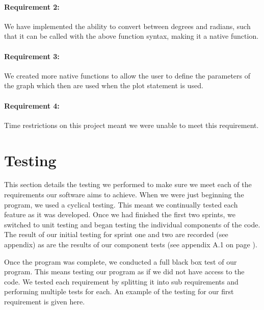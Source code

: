 \documentclass[a4paper, oneside, 11pt]{report}
\begin{document}
\subsubsection{Requirement 2:}
We have implemented the ability to convert between degrees and radians, such that it can be called with the above function syntax, making it a native function.

\subsubsection{Requirement 3:}
We created more native functions to allow the user to define the parameters of the graph which then are used when the plot statement is used.

\subsubsection{Requirement 4:}
Time restrictions on this project meant we were unable to meet this requirement.

\chapter{Testing}

This section details the testing we performed to make sure we meet each of the requirements our software aims to achieve. When we were just beginning the program, we used a cyclical testing. This meant we continually tested each feature as it was developed. Once we had finished the first two sprints, we switched to unit testing and began testing the individual components of the code. The result of our initial testing for sprint one and two are recorded (see appendix) as are the results of our component tests (see appendix A.1 on page \pageref{testing}).

Once the program was complete, we conducted a full black box test of our program. This means testing our program as if we did not have access to the code. We tested each requirement by splitting it into sub requirements and performing multiple tests for each. An example of the testing for our first requirement is given here.
\end{document}
